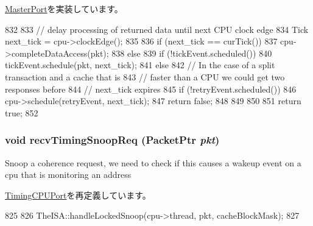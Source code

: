 \hyperlink{classMasterPort_abd323548d6c93f8b0543f1fe3a86ca35}{MasterPort}を実装しています。


\begin{DoxyCode}
832 {
833     // delay processing of returned data until next CPU clock edge
834     Tick next_tick = cpu->clockEdge();
835 
836     if (next_tick == curTick()) {
837         cpu->completeDataAccess(pkt);
838     } else {
839         if (!tickEvent.scheduled()) {
840             tickEvent.schedule(pkt, next_tick);
841         } else {
842             // In the case of a split transaction and a cache that is
843             // faster than a CPU we could get two responses before
844             // next_tick expires
845             if (!retryEvent.scheduled())
846                 cpu->schedule(retryEvent, next_tick);
847             return false;
848         }
849     }
850 
851     return true;
852 }
\end{DoxyCode}
\hypertarget{classTimingSimpleCPU_1_1DcachePort_aff3031c56fc4947a19695c868bb8233e}{
\subsubsection[{recvTimingSnoopReq}]{\setlength{\rightskip}{0pt plus 5cm}void recvTimingSnoopReq ({\bf PacketPtr} {\em pkt})}}
\label{classTimingSimpleCPU_1_1DcachePort_aff3031c56fc4947a19695c868bb8233e}
Snoop a coherence request, we need to check if this causes a wakeup event on a cpu that is monitoring an address 

\hyperlink{classTimingSimpleCPU_1_1TimingCPUPort_ae43c73eff109f907118829fcfa9e7096}{TimingCPUPort}を再定義しています。


\begin{DoxyCode}
825 {
826     TheISA::handleLockedSnoop(cpu->thread, pkt, cacheBlockMask);
827 }
\end{DoxyCode}


